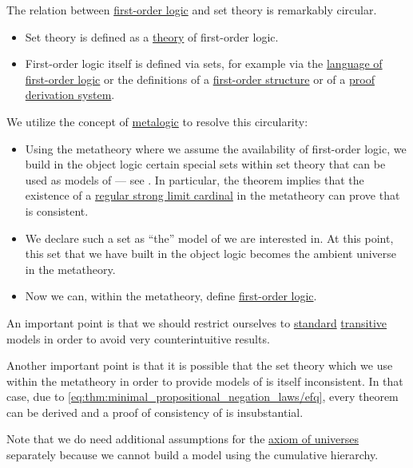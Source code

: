 \begin{remark}\label{rem:set_definition_recursion}
  The relation between \hyperref[subsec:first_order_logic]{first-order logic} and set theory is remarkably circular.

  \begin{itemize}
    \item Set theory is defined as a \hyperref[first_order_theory]{theory} of first-order logic.

    \item First-order logic itself is defined via sets, for example via the \hyperref[def:first_order_language]{language of first-order logic} or the definitions of a \hyperref[def:first_order_structure]{first-order structure} or of a \hyperref[def:proof_derivation_system]{proof derivation system}.
  \end{itemize}

  We utilize the concept of \hyperref[rem:metalogic]{metalogic} to resolve this circularity:
  \begin{itemize}
    \item Using the metatheory where we assume the availability of first-order logic, we build in the object logic certain special sets within set theory that can be used as models of  --- see . In particular, the theorem implies that the existence of a \hyperref[rem:strongly_inaccessible_cardinal]{regular strong limit cardinal} in the metatheory can prove that  is consistent.

    \item We declare such a set as \enquote{the} model of  we are interested in. At this point, this set that we have built in the object logic becomes the ambient universe in the metatheory.

    \item Now we can, within the metatheory, define \hyperref[subsec:first_order_logic]{first-order logic}.
  \end{itemize}

  An important point is that we should restrict ourselves to \hyperref[rem:standard_model_of_set_theory]{standard} \hyperref[rem:transitive_model_of_set_theory]{transitive} models in order to avoid very counterintuitive results.

  Another important point is that it is possible that the set theory which we use within the metatheory in order to provide models of  is itself inconsistent. In that case, due to \eqref{eq:thm:minimal_propositional_negation_laws/efq}, every theorem can be derived and a proof of consistency of  is insubstantial.

  Note that we do need additional assumptions for the \hyperref[def:axiom_of_universes]{axiom of universes} separately because we cannot build a model using the cumulative hierarchy.
\end{remark}

